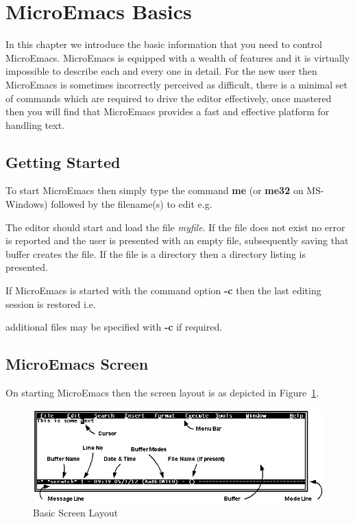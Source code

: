 \documentclass[11pt,a4paper,pdftex]{article}
\begin{document}

\cleardoublepage
\section{MicroEmacs Basics}

  In this chapter we introduce the basic information that you need to control
  MicroEmacs. MicroEmacs is equipped with a wealth of features and it is
  virtually impossible to describe each and every one in detail. For the new
  user then MicroEmacs is sometimes incorrectly perceived as difficult, there
  is a minimal set of commands which are required to drive the editor
  effectively, once mastered then you will find that MicroEmacs provides a
  fast and effective platform for handling text.

\subsection{Getting Started}

  To start MicroEmacs then simply type the command \textbf{me} (or
  \textbf{me32} on MS-Windows) followed by the filename(s) to edit e.g.


  The editor should start and load the file \textit{myfile}. If the file does
  not exist no error is reported and the user is presented with an empty file,
  subsequently saving that buffer creates the file. If the file is a directory
  then a directory listing is presented.

  If MicroEmacs is started with the command option \textbf{-c} then the last
  editing session is restored i.e.

  
  additional files may be specified with \textbf{-c} if required.

\subsection{MicroEmacs Screen}

  On starting MicroEmacs then the screen layout is as depicted in
  Figure~\ref{fig:basicscreen}.

  \begin{figure}[!hbt]
    \begin{center}
      \includegraphics[keepaspectratio,width=5in]{basicscreenannot}
      \caption{Basic Screen Layout}
      \label{fig:basicscreen}
    \end{center}
  \end{figure}
\end{document}
